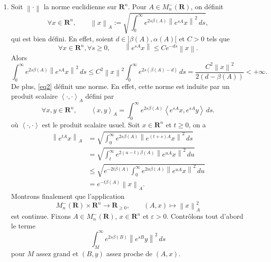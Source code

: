\documentclass[french, 12pt]{article}
\theoremstyle{definition}
\newcommand{\norm}[1]{\left\|#1\right\|}
\newcommand{\sprod}[1]{\left<#1\right>}
\newcommand{\Rbb}{\mathbf{R}}
\begin{document}
\begin{enumerate}
    \item \label{Partie12} Soit $\norm{\cdot}$ la norme euclidienne sur $\Rbb^n$. Pour $A \in M^-_n(\Rbb)$, on d\'efinit
        \begin{equation} \label{eq2}
            \forall x \in \Rbb^n, \qquad \norm{x}_A:= \sqrt{\int_{0}^\infty e^{2s\beta(A)} \norm{e^{sA}x}^2 \, ds},
        \end{equation}
    qui est bien d\'efini. En effet, soient $d \in ]\beta(A),\alpha(A)[$ et $C > 0$ tels que
        $$\forall x \in \Rbb^n,\forall s \ge 0, \qquad \norm{e^{sA}x} \le Ce^{-ds}\norm{x}.$$
    Alors 
        $$\int_{0}^\infty e^{2s\beta(A)} \norm{e^{sA}x}^2 \, ds \le C^2\norm{x}^2 \int_{0}^\infty e^{2s(\beta(A) - d)}\,ds = \frac{C^2\norm{x}^2}{2(d - \beta(A))} < +\infty.$$
    De plus, \eqref{eq2} d\'efinit une norme. En effet, cette norme est induite par un produit scalaire $\sprod{\cdot,\cdot}_A$ d\'efini par
        $$\forall x,y \in \Rbb^n, \qquad \sprod{x,y}_A = {\int_{0}^\infty e^{2s\beta(A)} \sprod{e^{sA}x,e^{sA}y} \, ds}.$$
    o\`u $\sprod{\cdot,\cdot}$ est le produit scalaire usuel. Soit $x \in \Rbb^n$ et $t \ge 0$, on a
        \begin{align*}
            \norm{e^{tA}x}_A & = \sqrt{\int_{0}^\infty e^{2s\beta(A)} \norm{e^{(t+s)A}x}^2 \, ds} \\
            & =  \sqrt{\int_{t}^\infty e^{2(u - t)\beta(A)} \norm{e^{uA}x}^2 \, du} \\
            & \le  \sqrt{e^{-2t\beta(A)}\int_{0}^\infty e^{2u\beta(A)} \norm{e^{uA}x}^2 \, du} \\
            & = e^{-t\beta(A)}\norm{x}_A.
        \end{align*}
    Montrons finalement que l'application 
        $$M_n^{-}(\Rbb) \times \Rbb^n \to \Rbb_{\ge 0},\qquad (A,x) \mapsto \norm{x}_A^2$$
    est continue. Fixons $A \in M_n^-(\Rbb)$, $x \in \Rbb^n$ et $\varepsilon > 0$. Contr\^olons tout d'abord le terme 
        $$\int_M^\infty e^{2s\beta(B)}\norm{e^{sB}y}^2\,ds$$
    pour $M$ assez grand et $(B,y)$ assez proche de $(A,x)$.
   

\end{enumerate}
\end{document}
